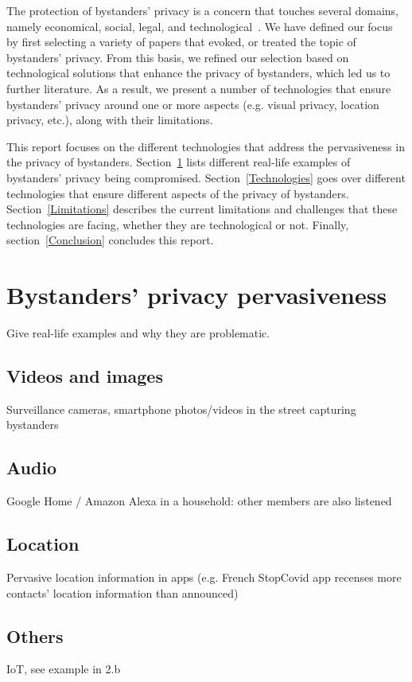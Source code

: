 \documentclass[conference]{IEEEtran}
\begin{document}
The protection of bystanders' privacy is a concern that touches several domains, namely economical, social, legal, and technological~\cite{lu2017privacy}. We have defined our focus by first selecting a variety of papers that evoked, or treated the topic of bystanders' privacy. From this basis, we refined our selection based on technological solutions that enhance the privacy of bystanders, which led us to further literature. As a result, we present a number of technologies that ensure bystanders' privacy around one or more aspects (e.g. visual privacy, location privacy, etc.), along with their limitations.

This report focuses on the different technologies that address the pervasiveness in the privacy of bystanders. Section~\ref{BystandersPrivacy} lists different real-life examples of bystanders' privacy being compromised. Section~\ref{Technologies} goes over different technologies that ensure different aspects of the privacy of bystanders. Section~\ref{Limitations} describes the current limitations and challenges that these technologies are facing, whether they are technological or not. Finally, section~\ref{Conclusion} concludes this report.

\section{Bystanders’ privacy pervasiveness}\label{BystandersPrivacy}
Give real-life examples and why they are problematic.
\subsection{Videos and images}
Surveillance cameras, smartphone photos/videos in the street capturing bystanders
\subsection{Audio}
Google Home / Amazon Alexa in a household: other members are also listened
\subsection{Location}
Pervasive location information in apps (e.g. French StopCovid app recenses more contacts’ location information than announced)
\subsection{Others}
IoT, see example in 2.b
\end{document}
